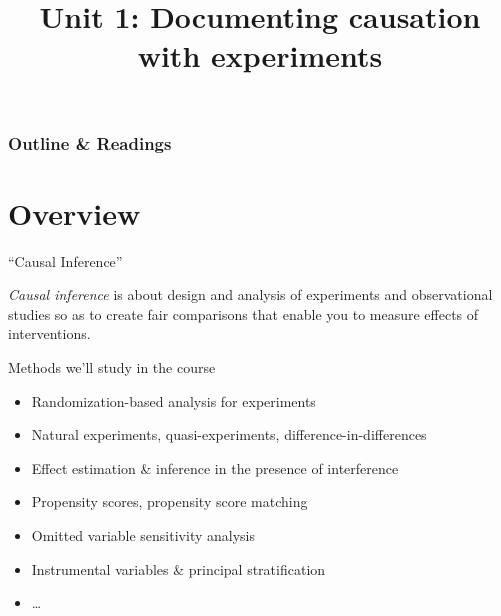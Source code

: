 %

%

%





\title{Unit 1: Documenting causation with experiments}




  \begin{frame}
    \frametitle{Outline \& Readings}

\tableofcontents[subsectionstyle=show/hide/hide]

\end{frame}

\itnote{
\item 
}

\section{Overview}

\begin{frame}{``Causal Inference''}

 \textit{Causal inference} is about design and analysis of experiments
 and observational studies so as to create fair comparisons that
 enable you to measure effects of interventions.


\end{frame}

\begin{frame}[label=whatWeWillCoverFr]{Methods we'll study in the course}
  \begin{itemize}
  \item Randomization-based analysis for experiments
  \item Natural experiments, quasi-experiments,
    difference-in-differences
  \item Effect estimation \& inference in the presence of interference 
  \item Propensity scores, propensity score matching
  \item Omitted variable sensitivity analysis
  \item Instrumental variables \& principal stratification
  \item \ldots
  \end{itemize}
\end{frame}

